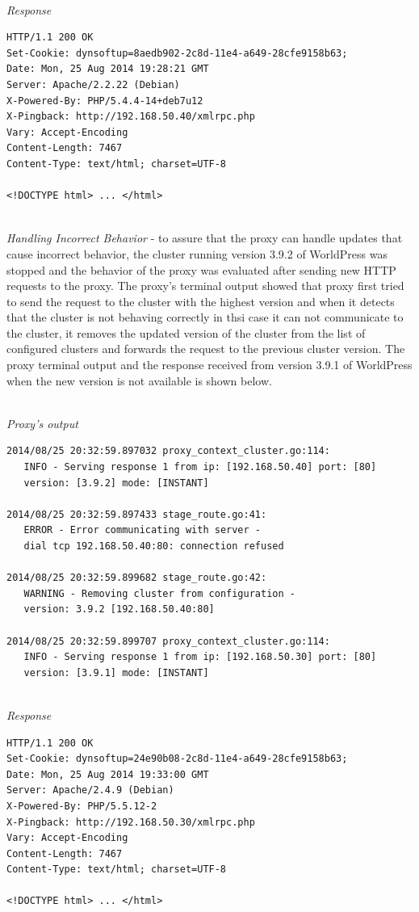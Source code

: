 \documentclass[a4paper,11pt,twoside]{article}
\begin{document}
\noindent\\
\textit{Response}
\begin{lstlisting}[language=terminal]
HTTP/1.1 200 OK
Set-Cookie: dynsoftup=8aedb902-2c8d-11e4-a649-28cfe9158b63;
Date: Mon, 25 Aug 2014 19:28:21 GMT
Server: Apache/2.2.22 (Debian)
X-Powered-By: PHP/5.4.4-14+deb7u12
X-Pingback: http://192.168.50.40/xmlrpc.php
Vary: Accept-Encoding
Content-Length: 7467
Content-Type: text/html; charset=UTF-8

<!DOCTYPE html> ... </html>
\end{lstlisting}

\noindent\\
\textit{Handling Incorrect Behavior} - to assure that the proxy can handle updates that cause incorrect behavior, the cluster running version 3.9.2 of WorldPress was stopped and the behavior of the proxy was evaluated after sending new HTTP requests to the proxy. The proxy's terminal output showed that proxy first tried to send the request to the cluster with the highest version and when it detects that the cluster is not behaving correctly in thsi case it can not communicate to the cluster, it removes the updated version of the cluster from the list of configured clusters and forwards the request to the previous cluster version. The proxy terminal output and the response received from version 3.9.1 of WorldPress when the new version is not available is shown below. \smallskip 

\noindent\\
\textit{Proxy's output}
\begin{lstlisting}[language=terminal]
2014/08/25 20:32:59.897032 proxy_context_cluster.go:114:     
   INFO - Serving response 1 from ip: [192.168.50.40] port: [80] 
   version: [3.9.2] mode: [INSTANT]
   
2014/08/25 20:32:59.897433 stage_route.go:41:    
   ERROR - Error communicating with server - 
   dial tcp 192.168.50.40:80: connection refused

2014/08/25 20:32:59.899682 stage_route.go:42:  
   WARNING - Removing cluster from configuration - 
   version: 3.9.2 [192.168.50.40:80]

2014/08/25 20:32:59.899707 proxy_context_cluster.go:114:     
   INFO - Serving response 1 from ip: [192.168.50.30] port: [80] 
   version: [3.9.1] mode: [INSTANT]
\end{lstlisting}

\noindent\\
\textit{Response}
\begin{lstlisting}[language=terminal]
HTTP/1.1 200 OK
Set-Cookie: dynsoftup=24e90b08-2c8d-11e4-a649-28cfe9158b63;
Date: Mon, 25 Aug 2014 19:33:00 GMT
Server: Apache/2.4.9 (Debian)
X-Powered-By: PHP/5.5.12-2
X-Pingback: http://192.168.50.30/xmlrpc.php
Vary: Accept-Encoding
Content-Length: 7467
Content-Type: text/html; charset=UTF-8

<!DOCTYPE html> ... </html>  
\end{lstlisting}
   
\end{document}
